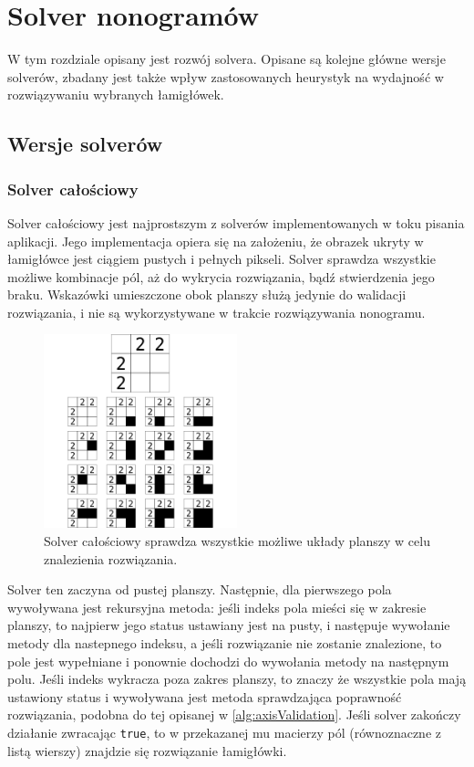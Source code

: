 \chapter{Solver nonogramów}
\thispagestyle{chapterBeginStyle}

    W tym rozdziale opisany jest rozwój solvera. Opisane są kolejne główne wersje solverów, zbadany
jest także wpływ zastosowanych heurystyk na wydajność w rozwiązywaniu wybranych łamigłówek.



\section{Wersje solverów}


\subsection{Solver całościowy}
    Solver całościowy jest najprostszym z solverów implementowanych w toku pisania aplikacji. Jego
implementacja opiera się na założeniu, że obrazek ukryty w łamigłówce jest ciągiem pustych i pełnych
pikseli. Solver sprawdza wszystkie możliwe kombinacje pól, aż do wykrycia rozwiązania, bądź stwierdzenia
jego braku. Wskazówki umieszczone obok planszy służą jedynie do walidacji rozwiązania, i nie są
wykorzystywane w trakcie rozwiązywania nonogramu.

\begin{figure}[!htb]
    \centering
    \includegraphics[width=0.5\textwidth]{images/all_solver_example.png}
    \caption{Solver całościowy sprawdza wszystkie możliwe układy planszy w celu znalezienia rozwiązania.}
\end{figure}

    Solver ten zaczyna od pustej planszy. Następnie, dla pierwszego pola wywoływana jest rekursyjna
metoda: jeśli indeks pola mieści się w zakresie planszy, to najpierw jego status ustawiany jest na
pusty, i następuje wywołanie metody dla nastepnego indeksu, a jeśli rozwiązanie nie zostanie znalezione,
to pole jest wypełniane i ponownie dochodzi do wywołania metody na następnym polu. Jeśli indeks
wykracza poza zakres planszy, to znaczy że wszystkie pola mają ustawiony status i wywoływana jest
metoda sprawdzająca poprawność rozwiązania, podobna do tej opisanej w \ref{alg:axisValidation}.
Jeśli solver zakończy działanie zwracając \texttt{true}, to w przekazanej mu macierzy pól 
(równoznaczne z listą wierszy) znajdzie się rozwiązanie łamigłówki.

